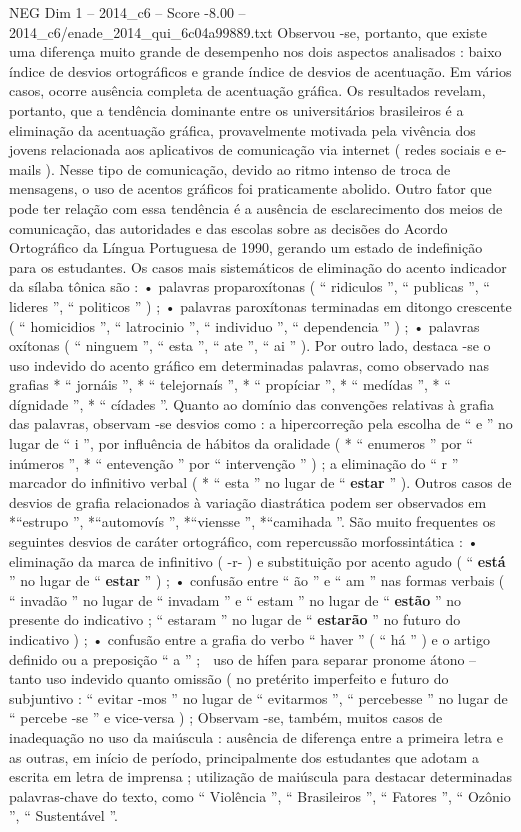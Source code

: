 \begin{textsample}{NEG Dim 1 – 2014\_c6 – Score -8.00 – 2014\_c6/enade\_2014\_qui\_6c04a99889.txt}
Observou -se, portanto, que existe uma diferença muito grande de desempenho nos dois aspectos analisados : baixo índice de desvios ortográficos e grande índice de desvios de acentuação.
Em vários casos, ocorre ausência completa de acentuação gráfica.
Os resultados revelam, portanto, que a tendência dominante entre os universitários brasileiros é a eliminação da acentuação gráfica, provavelmente motivada pela vivência dos jovens relacionada aos aplicativos de comunicação via internet ( redes sociais e e-mails ).
Nesse tipo de comunicação, devido ao ritmo intenso de troca de mensagens, o uso de acentos gráficos foi praticamente abolido.
Outro fator que pode ter relação com essa tendência é a ausência de esclarecimento dos meios de comunicação, das autoridades e das escolas sobre as decisões do Acordo Ortográfico da Língua Portuguesa de 1990, gerando um estado de indefinição para os estudantes.
Os casos mais sistemáticos de eliminação do acento indicador da sílaba tônica são : • palavras proparoxítonas ( “ ridiculos ”, “ publicas ”, “ lideres ”, “ politicos ” ) ; • palavras paroxítonas terminadas em ditongo crescente ( “ homicidios ”, “ latrocinio ”, “ individuo ”, “ dependencia ” ) ; • palavras oxítonas ( “ ninguem ”, “ esta ”, “ ate ”, “ ai ” ).
Por outro lado, destaca -se o uso indevido do acento gráfico em determinadas palavras, como observado nas grafias * “ jornáis ”, * “ telejornaís ”, * “ propíciar ”, * “ medídas ”, * “ dígnidade ”, * “ cídades ”.
Quanto ao domínio das convenções relativas à grafia das palavras, observam -se desvios como : a hipercorreção pela escolha de “ e ” no lugar de “ i ”, por influência de hábitos da oralidade ( * “ enumeros ” por “ inúmeros ”, * “ entevenção ” por “ intervenção ” ) ; a eliminação do “ r ” marcador do infinitivo verbal ( * “ esta ” no lugar de “ \textbf{estar} ” ).
Outros casos de desvios de grafia relacionados à variação diastrática podem ser observados em *“estrupo ”, *“automovís ”, *“viensse ”, *“camihada ”.
São muito frequentes os seguintes desvios de caráter ortográfico, com repercussão morfossintática : • eliminação da marca de infinitivo ( -r- ) e substituição por acento agudo ( “ \textbf{está} ” no lugar de “ \textbf{estar} ” ) ; • confusão entre “ ão ” e “ am ” nas formas verbais ( “ invadão ” no lugar de “ invadam ” e “ estam ” no lugar de “ \textbf{estão} ” no presente do indicativo ; “ estaram ” no lugar de “ \textbf{estarão} ” no futuro do indicativo ) ; • confusão entre a grafia do verbo “ haver ” ( “ há ” ) e o artigo definido ou a preposição “ a ” ;  uso de hífen para separar pronome átono – tanto uso indevido quanto omissão ( no pretérito imperfeito e futuro do subjuntivo : “ evitar -mos ” no lugar de “ evitarmos ”, “ percebesse ” no lugar de “ percebe -se ” e vice-versa ) ; Observam -se, também, muitos casos de inadequação no uso da maiúscula : ausência de diferença entre a primeira letra e as outras, em início de período, principalmente dos estudantes que adotam a escrita em letra de imprensa ; utilização de maiúscula para destacar determinadas palavras-chave do texto, como “ Violência ”, “ Brasileiros ”, “ Fatores ”, “ Ozônio ”, “ Sustentável ”.

\end{textsample}
